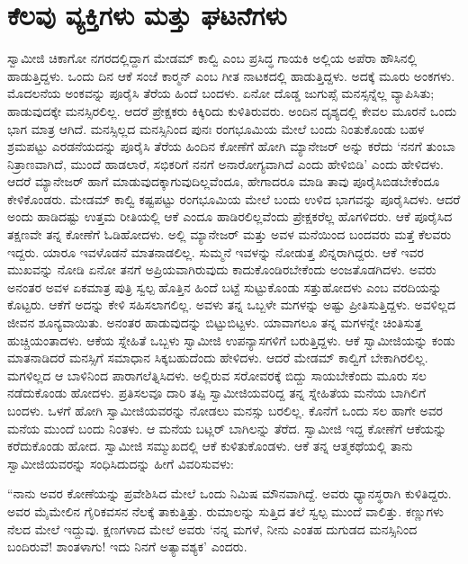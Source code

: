 
\chapter{ಕೆಲವು ವ್ಯಕ್ತಿಗಳು ಮತ್ತು ಘಟನೆಗಳು }

 ಸ್ವಾಮೀಜಿ ಚಿಕಾಗೋ ನಗರದಲ್ಲಿದ್ದಾಗ ಮೇಡಮ್ ಕಾಲ್ವಿ ಎಂಬ ಪ್ರಸಿದ್ಧ ಗಾಯಕಿ ಅಲ್ಲಿಯ ಅಪೆರಾ ಹೌಸಿನಲ್ಲಿ ಹಾಡುತ್ತಿದ್ದಳು. ಒಂದು ದಿನ ಆಕೆ ಸಂಜೆ ಕಾರ್‍ಮನ್ ಎಂಬ ಗೀತ ನಾಟಕದಲ್ಲಿ ಹಾಡುತ್ತಿದ್ದಳು. ಅದಕ್ಕೆ ಮೂರು ಅಂಕಗಳು. ಮೊದಲನೆಯ ಅಂಕವನ್ನು ಪೂರೈಸಿ ತೆರೆಯ ಹಿಂದೆ ಬಂದಳು. ಏನೋ ದೊಡ್ಡ ಜುಗುಪ್ಸೆ ಮನಸ್ಸನ್ನೆಲ್ಲ ವ್ಯಾಪಿಸಿತು; ಹಾಡುವುದಕ್ಕೇ ಮನಸ್ಸಿರಲಿಲ್ಲ. ಆದರೆ ಪ್ರೇಕ್ಷಕರು ಕಿಕ್ಕಿರಿದು ಕುಳಿತಿರುವರು. ಅಂದಿನ ದೃಶ್ಯದಲ್ಲಿ ಕೇವಲ ಮೂರನೆ ಒಂದು ಭಾಗ ಮಾತ್ರ ಆಗಿದೆ. ಮನಸ್ಸಿಲ್ಲದ ಮನಸ್ಸಿನಿಂದ ಪುನಃ ರಂಗಭೂಮಿಯ ಮೇಲೆ ಬಂದು ನಿಂತುಕೊಂಡು ಬಹಳ ಶ್ರಮಪಟ್ಟು ಎರಡನೆಯದನ್ನು ಪೂರೈಸಿ ತೆರೆಯ ಹಿಂದಿನ ಕೋಣೆಗೆ ಹೋಗಿ ಮ್ಯಾನೇಜರ್ ಅನ್ನು ಕರೆದು ‘ನನಗೆ ತುಂಬಾ ನಿತ್ರಾಣವಾಗಿದೆ, ಮುಂದೆ ಹಾಡಲಾರೆ, ಸಭಿಕರಿಗೆ ನನಗೆ ಅನಾರೋಗ್ಯವಾಗಿದೆ ಎಂದು ಹೇಳಿಬಿಡಿ’ ಎಂದು ಹೇಳಿದಳು. ಆದರೆ ಮ್ಯಾನೇಜರ್ ಹಾಗೆ ಮಾಡುವುದಕ್ಕಾಗುವುದಿಲ್ಲವೆಂದೂ, ಹೇಗಾದರೂ ಮಾಡಿ ತಾವು ಪೂರೈಸಿಬಿಡಬೇಕೆಂದೂ ಕೇಳಿಕೊಂಡರು. ಮೇಡಮ್ ಕಾಲ್ವಿ ಕಷ್ಟಪಟ್ಟು ರಂಗಭೂಮಿಯ ಮೇಲೆ ಬಂದು ಉಳಿದ ಭಾಗವನ್ನು ಪೂರೈಸಿದಳು. ಆದರೆ ಅಂದು ಹಾಡಿದಷ್ಟು ಉತ್ತಮ ರೀತಿಯಲ್ಲಿ ಆಕೆ ಎಂದೂ ಹಾಡಿರಲಿಲ್ಲವೆಂದು ಪ್ರೇಕ್ಷಕರೆಲ್ಲ ಹೊಗಳಿದರು. ಆಕೆ ಪೂರೈಸಿದ ತಕ್ಷಣವೇ ತನ್ನ ಕೋಣೆಗೆ ಓಡಿಹೋದಳು. ಅಲ್ಲಿ ಮ್ಯಾನೇಜರ್ ಮತ್ತು ಅವಳ ಮನೆಯಿಂದ ಬಂದವರು ಮತ್ತೆ ಕೆಲವರು ಇದ್ದರು. ಯಾರೂ ಇವಳೊಡನೆ ಮಾತನಾಡಲಿಲ್ಲ. ಸುಮ್ಮನೆ ಇವಳನ್ನು ನೋಡುತ್ತ ಖಿನ್ನರಾಗಿದ್ದರು. ಆಕೆ ಇವರ ಮುಖವನ್ನು ನೋಡಿ ಏನೋ ತನಗೆ ಅಪ್ರಿಯವಾಗಿರುವುದು ಕಾದುಕೊಂಡಿರಬೇಕೆಂದು ಅಂಜತೊಡಗಿದಳು. ಅವರು ಅನಂತರ ಅವಳ ಏಕಮಾತ್ರ ಪುತ್ರಿ ಸ್ವಲ್ಪ ಹೊತ್ತಿನ ಹಿಂದೆ ಬಟ್ಟೆ ಸುಟ್ಟುಕೊಂಡು ಸತ್ತುಹೋದಳು ಎಂಬ ವರದಿಯನ್ನು ಕೊಟ್ಟರು. ಆಕೆಗೆ ಅದನ್ನು ಕೇಳಿ ಸಹಿಸಲಾಗಲಿಲ್ಲ. ಅವಳು ತನ್ನ ಒಬ್ಬಳೇ ಮಗಳನ್ನು ಅಷ್ಟು ಪ್ರೀತಿಸುತ್ತಿದ್ದಳು. ಅವಳಿಲ್ಲದ ಜೀವನ ಶೂನ್ಯವಾಯಿತು. ಅನಂತರ ಹಾಡುವುದನ್ನು ಬಿಟ್ಟುಬಿಟ್ಟಳು. ಯಾವಾಗಲೂ ತನ್ನ ಮಗಳನ್ನೇ ಚಿಂತಿಸುತ್ತ ಹುಚ್ಚಿಯಂತಾದಳು. ಆಕೆಯ ಸ್ನೇಹಿತೆ ಒಬ್ಬಳು ಸ್ವಾಮೀಜಿ ಉಪನ್ಯಾಸಗಳಿಗೆ ಬರುತ್ತಿದ್ದಳು. ಆಕೆ ಸ್ವಾಮೀಜಿಯನ್ನು ಕಂಡು ಮಾತನಾಡಿದರೆ ಮನಸ್ಸಿಗೆ ಸಮಾಧಾನ ಸಿಕ್ಕಬಹುದೆಂದು ಹೇಳಿದಳು. ಆದರೆ ಮೇಡಮ್ ಕಾಲ್ವಿಗೆ ಬೇಕಾಗಿರಲಿಲ್ಲ. ಮಗಳಿಲ್ಲದ ಆ ಬಾಳಿನಿಂದ ಪಾರಾಗಲೆತ್ನಿಸಿದಳು. ಅಲ್ಲಿರುವ ಸರೋವರಕ್ಕೆ ಬಿದ್ದು ಸಾಯಬೇಕೆಂದು ಮೂರು ಸಲ ನಡೆದುಕೊಂಡು ಹೋದಳು. ಪ್ರತಿಸಲವೂ ದಾರಿ ತಪ್ಪಿ ಸ್ವಾಮೀಜಿಯವರಿದ್ದ ತನ್ನ ಸ್ನೇಹಿತೆಯ ಮನೆಯ ಬಾಗಿಲಿಗೆ ಬಂದಳು. ಒಳಗೆ ಹೋಗಿ ಸ್ವಾಮೀಜಿಯವರನ್ನು ನೋಡಲು ಮನಸ್ಸು ಬರಲಿಲ್ಲ. ಕೊನೆಗೆ ಒಂದು ಸಲ ಹಾಗೇ ಅವರ ಮನೆಯ ಮುಂದೆ ಬಂದು ನಿಂತಳು. ಆ ಮನೆಯ ಬಟ್ಲರ್ ಬಾಗಿಲನ್ನು ತೆರೆದ. ಸ್ವಾಮೀಜಿ ಇದ್ದ ಕೋಣೆಗೆ ಆಕೆಯನ್ನು ಕರೆದುಕೊಂಡು ಹೋದ. ಸ್ವಾಮೀಜಿ ಸಮ್ಮುಖದಲ್ಲಿ ಆಕೆ ಕುಳಿತುಕೊಂಡಳು. ಆಕೆ ತನ್ನ ಆತ್ಮಕಥೆಯಲ್ಲಿ ತಾನು ಸ್ವಾಮೀಜಿಯವರನ್ನು ಸಂಧಿಸಿದುದನ್ನು ಹೀಗೆ ವಿವರಿಸುವಳು: 

 “ನಾನು ಅವರ ಕೋಣೆಯನ್ನು ಪ್ರವೇಶಿಸಿದ ಮೇಲೆ ಒಂದು ನಿಮಿಷ ಮೌನವಾಗಿದ್ದೆ. ಅವರು ಧ್ಯಾನಸ್ಥರಾಗಿ ಕುಳಿತಿದ್ದರು. ಅವರ ಮೈಮೇಲಿನ ಗೈರಿಕವಸನ ನೆಲಕ್ಕೆ ತಾಕುತ್ತಿತ್ತು. ರುಮಾಲನ್ನು ಸುತ್ತಿದ ತಲೆ ಸ್ವಲ್ಪ ಮುಂದೆ ವಾಲಿತ್ತು. ಕಣ್ಣುಗಳು ನೆಲದ ಮೇಲೆ ಇದ್ದುವು. ಕ್ಷಣಗಳಾದ ಮೇಲೆ ಅವರು ‘ನನ್ನ ಮಗಳೆ, ನೀನು ಎಂತಹ ದುಗುಡದ ಮನಸ್ಸಿನಿಂದ ಬಂದಿರುವೆ! ಶಾಂತಳಾಗು! ಇದು ನಿನಗೆ ಅತ್ಯಾವಶ್ಯಕ’ ಎಂದರು.

